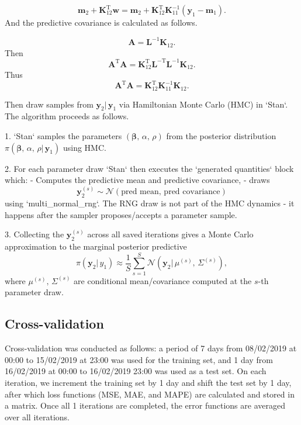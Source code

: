       $$\mathbf{m}_{2} + \mathbf{K}_{12}^{\text{T}}\mathbf{w} = \mathbf{m}_{2} + \mathbf{K}_{12}^{\text{T}}\mathbf{K}_{11}^{-1}(\mathbf{y}_{1} - \mathbf{m}_{1}).$$
      And the predictive covariance is calculated as follows.

      $$\mathbf{A} = \mathbf{L}^{-1} \mathbf{K}_{12}.$$
      Then $$\mathbf{A}^{\text{T}} \mathbf{A} = \mathbf{K}_{12}^{\text{T}} \mathbf{L}^{-\text{T}} \mathbf{L}^{-1} \mathbf{K}_{12}.$$
      Thus $$\mathbf{A}^{\text{T}} \mathbf{A} = \mathbf{K}_{12}^{\text{T}} \mathbf{K}_{11}^{-1} \mathbf{K}_{12}.$$

      Then draw samples from $\mathbf{y}_{2}|\, \mathbf{y}_{1}$ via Hamiltonian Monte Carlo (HMC) in `Stan`. The algorithm proceeds as follows.

      1. `Stan` samples the parameters $(\boldsymbol{\beta},\, \alpha,\, \rho)$ from the posterior distribution $\pi(\boldsymbol{\beta},\, \alpha,\, \rho|\, \mathbf{y}_{1})$ using HMC.

      2. For each parameter draw `Stan` then executes the `generated quantities` block which:
      - Computes the predictive mean and predictive covariance,
      - draws $$\mathbf{y}_{2}^{(s)} \sim \mathcal{N}(\text{pred mean},\, \text{pred covariance})$$ using `multi_normal_rng`. 
         The RNG draw is not part of the HMC dynamics - it happens after the sampler proposes/accepts a parameter sample.

      3. Collecting the $\mathbf{y}_{2}^{(s)}$ across all saved iterations gives a Monte Carlo approximation to the marginal posterior predictive $$\pi(\mathbf{y}_{2}|\, y_{1}) \approx \frac{1}{S} \sum_{s=1}^{S} \mathcal{N}(\mathbf{y}_{2}|\, \mu^{(s)},\, \Sigma^{(s)}),$$ where $\mu^{(s)},\, \Sigma^{(s)}$ are conditional mean/covariance computed at the $s$-th parameter draw.
   
   \subsection{Cross-validation}

      Cross-validation was conducted as follows: a period of 7 days from 08/02/2019 at 00:00 to 15/02/2019 at 23:00 was used for the training set, and 1 day from 16/02/2019 at 00:00 to 16/02/2019 23:00 was used as a test set. On each iteration, we increment the training set by 1 day and shift the test set by 1 day, after which loss functions (MSE, MAE, and MAPE) are calculated and stored in a matrix. Once all 1 iterations are completed, the error functions are averaged over all iterations.

